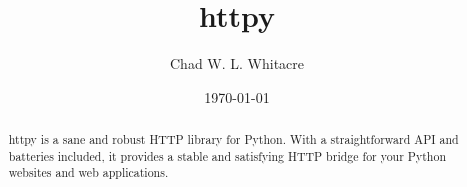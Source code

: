 \documentclass{manual}
\title{httpy}
\author{Chad W. L. Whitacre}
\date\today
\begin{document}
\maketitle

\begin{abstract}

\noindent
httpy is a sane and robust HTTP library for Python. With a straightforward API
and batteries included, it provides a stable and satisfying HTTP bridge for your
Python websites and web applications.

\end{abstract}








%
\end{document}
